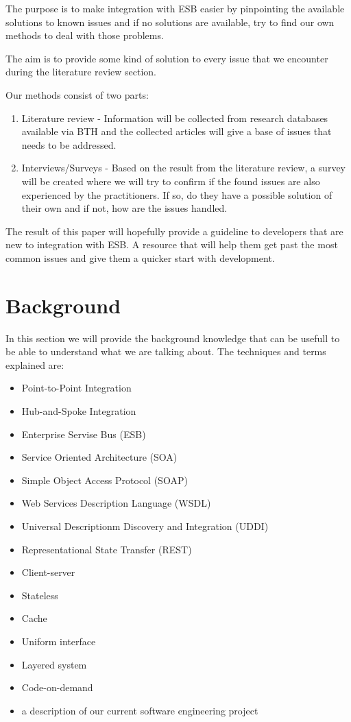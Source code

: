\documentclass{llncs}
\begin{document}
The purpose is to make integration with ESB easier by pinpointing the available solutions to known issues and if no solutions are available, try to find our own methods to deal with those problems.

The aim is to provide some kind of solution to every issue that we encounter during the literature review section.

Our methods consist of two parts:
\begin{enumerate}
 \item Literature review - Information will be collected from research databases available via BTH and the collected articles will give a base of issues that needs to be addressed.
 \item Interviews/Surveys - Based on the result from the literature review, a survey will be created where we will try to confirm if the found issues are also experienced by the practitioners. If so, do they have a possible solution of their own and if not, how are the issues handled.
\end{enumerate}
The result of this paper will hopefully provide a guideline to developers that are new to integration with ESB. A resource that will help them get past the most common issues and give them a quicker start with development.


\section{Background}
In this section we will provide the background knowledge that can be usefull to be able to understand what we are talking about.
The techniques and terms explained are:
\begin{itemize}
\item Point-to-Point Integration
\item Hub-and-Spoke Integration
\item Enterprise Servise Bus (ESB)
\item Service Oriented Architecture (SOA)
\item Simple Object Access Protocol (SOAP)
\item Web Services Description Language (WSDL)
\item Universal Descriptionm Discovery and Integration (UDDI)
\item Representational State Transfer (REST)
\item Client-server
\item Stateless
\item Cache
\item Uniform interface
\item Layered system
\item Code-on-demand
\item a description of our current software engineering project
\end{itemize}
\end{document}
